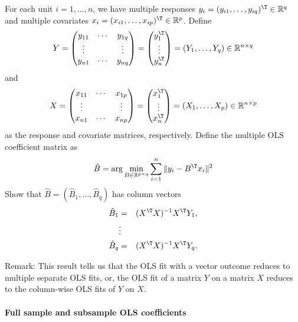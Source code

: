 For each unit $i=1,\ldots, n$, we have multiple responses
$y_i=(y_{i1},\ldots, y_{iq})^{\T}   \in \mathbb{R}^q  $ and multiple covariates $x_i=(x_{i1}, \ldots,x_{ip})^{\T}   \in \mathbb{R}^p $. Define
$$
Y =\begin{pmatrix}
y_{11} &\cdots & y_{1q} \\
\vdots & & \vdots \\
y_{n1} & \cdots & y_{nq}
\end{pmatrix} = \begin{pmatrix}
y_{1}^{\T} \\
\vdots \\
y_{n}^{\T}
\end{pmatrix} 
= (Y_1,\ldots,Y_q) 
\in \mathbb{R}^{n\times q}
$$
and
$$
X = \begin{pmatrix}
x_{11} &\cdots & x_{1p} \\
\vdots & & \vdots \\
x_{n1} & \cdots & x_{np}
\end{pmatrix} = \begin{pmatrix}
x_{1}^{\T} \\
\vdots \\
x_{n}^{\T}
\end{pmatrix} 
= (X_1,\ldots,X_p)
\in \mathbb{R}^{n\times p}
$$
as the response and covariate matrices, respectively. Define the multiple OLS coefficient matrix as
\[ \hat{B} = \arg\min_{B \in \mathbb{R}^{p \times q}}\sum_{i=1}^n \| y_i-B^{\T}x_i \|^2 \]
Show that
$
\hat{B} =(
\hat{B}_1, 
\ldots, 
\hat{B}_q 
)
$
has column vectors 
\begin{eqnarray*}
\hat{B}_1 &=& (X^{\T}  X)^{-1}X^{\T}  Y_1 ,\\
 &\vdots & \\ 
\hat{B}_q &=&(X^{\T}  X)^{-1}X^{\T} Y_q.
\end{eqnarray*}



Remark: 
This result tells us that the OLS fit with a vector outcome reduces to multiple separate OLS fits, or, the OLS fit of a matrix $Y$ on a matrix $X$ reduces to the column-wise OLS fits of $Y$ on $X$. 


\paragraph{Full sample and subsample OLS coefficients}\label{hw3::full-subsample-ols}

